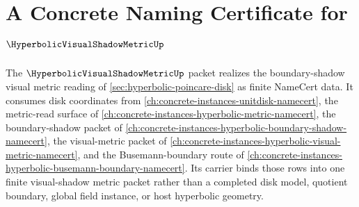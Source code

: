 \chapter{A Concrete Naming Certificate for $\HyperbolicVisualShadowMetricUp$}
\label{ch:concrete-instances-hyperbolic-visual-shadow-metric-namecert}

The $\HyperbolicVisualShadowMetricUp$ packet realizes the boundary-shadow visual metric reading of \autoref{sec:hyperbolic-poincare-disk} as finite NameCert data. It consumes disk coordinates from \autoref{ch:concrete-instances-unitdisk-namecert}, the metric-read surface of \autoref{ch:concrete-instances-hyperbolic-metric-namecert}, the boundary-shadow packet of \autoref{ch:concrete-instances-hyperbolic-boundary-shadow-namecert}, the visual-metric packet of \autoref{ch:concrete-instances-hyperbolic-visual-metric-namecert}, and the Busemann-boundary route of \autoref{ch:concrete-instances-hyperbolic-busemann-boundary-namecert}. Its carrier binds those rows into one finite visual-shadow metric packet rather than a completed disk model, quotient boundary, global field instance, or host hyperbolic geometry.

